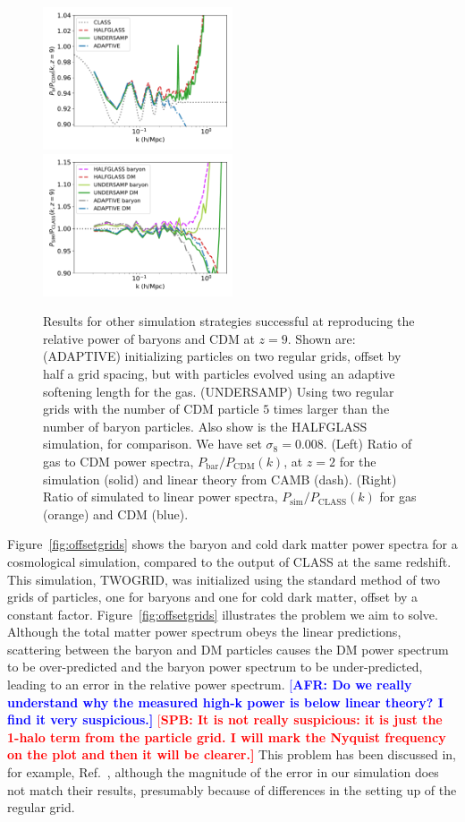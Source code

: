 \documentclass[a4paper,11pt]{article}
\newcommand{\spb}[1]{\textcolor{red}{[\bf SPB: #1]} }
\newcommand{\AFR}[1]{\textcolor{blue}{[\bf AFR: #1]} }
\begin{document}
\begin{figure}
\includegraphics[width=0.5\textwidth]{plots/oversample_9_relpower.pdf}
  \includegraphics[width=0.5\textwidth]{plots/oversample_9_class.pdf}
\caption{Results for other simulation strategies successful at reproducing the relative power of baryons and CDM at $z=9$. Shown are: (ADAPTIVE) initializing particles on two regular grids, offset by half a grid spacing, but with particles evolved using an adaptive softening length for the gas. (UNDERSAMP) Using two regular grids with the number of CDM particle $5$ times larger than the number of baryon particles. Also show is the HALFGLASS simulation, for comparison. We have set $\sigma_8 = 0.008$. (Left) Ratio of gas to CDM power spectra, $P_\mathrm{bar}/P_\mathrm{CDM}(k)$, at $z=2$ for the simulation (solid) and linear theory from CAMB (dash). (Right) Ratio of simulated to linear power spectra, $P_\mathrm{sim}/P_\mathrm{CLASS}(k)$ for gas (orange) and CDM (blue).}
  \label{fig:adaptivez9}
\end{figure}


Figure~\ref{fig:offsetgrids} shows the baryon and cold dark matter power spectra for a cosmological simulation, compared to the output of CLASS at the same redshift. This simulation, TWOGRID, was initialized using the standard method of two grids of particles, one for baryons and one for cold dark matter, offset by a constant factor. Figure~\ref{fig:offsetgrids} illustrates the problem we aim to solve. Although the total matter power spectrum obeys the linear predictions, scattering between the baryon and DM particles causes the DM power spectrum to be over-predicted and the baryon power spectrum to be under-predicted, leading to an error in the relative power spectrum.
\AFR{Do we really understand why the measured high-k power is below linear theory? I find it very suspicious.}\spb{It is not really suspicious: it is just the 1-halo term from the particle grid. I will mark the Nyquist frequency on the plot and then it will be clearer.}
This problem has been discussed in, for example, Ref.~\cite{Angulo:2013}, although the magnitude of the error in our simulation does not match their results, presumably because of differences in the setting up of the regular grid.
\end{document}
